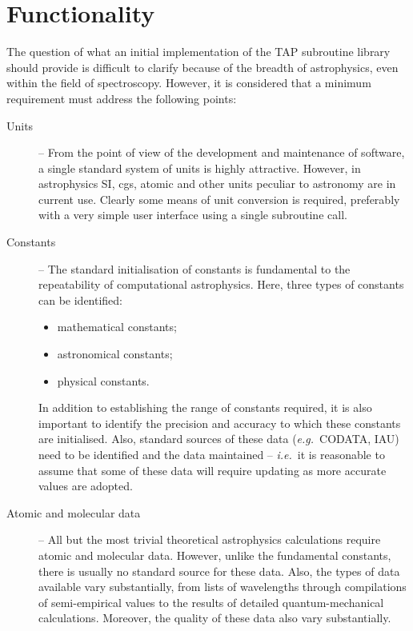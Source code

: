 \section {Functionality}
The question of what an initial implementation of the TAP subroutine library 
should provide is difficult to clarify because of the breadth of astrophysics, 
even within the field of spectroscopy.
However, it is considered that a minimum requirement must address the 
following points:

\begin {description}
\item [Units] -- From the point of view of the development and
maintenance of software, a single standard system of units is highly
attractive.
However, in astrophysics SI, cgs, atomic and other units peculiar to astronomy
are in current use.
Clearly some means of unit conversion is required, preferably with a very
simple user interface using a single subroutine call.

\item [Constants] -- The standard initialisation of constants is fundamental
to the repeatability of computational astrophysics.
Here, three types of constants can be identified:

\begin {itemize}
\item mathematical constants;
\item astronomical constants;
\item physical constants.
\end {itemize}

In addition to establishing the range of constants required, it is also
important to identify the precision and accuracy to which these constants
are initialised.
Also, standard sources of these data ({\em e.g.}\ CODATA, IAU) need to be
identified and the data maintained -- {\em i.e.}\ it is reasonable to assume
that some of these data will require updating as more accurate values are
adopted.

\item [Atomic and molecular data] -- All but the most trivial theoretical
astrophysics calculations require atomic and molecular data.
However, unlike the fundamental constants, there is usually no standard source
for these data.
Also, the types of data available vary substantially, from
lists of wavelengths through compilations of semi-empirical values
to the results of detailed quantum-mechanical calculations.
Moreover, the quality of these data also vary substantially.


\end{description}
